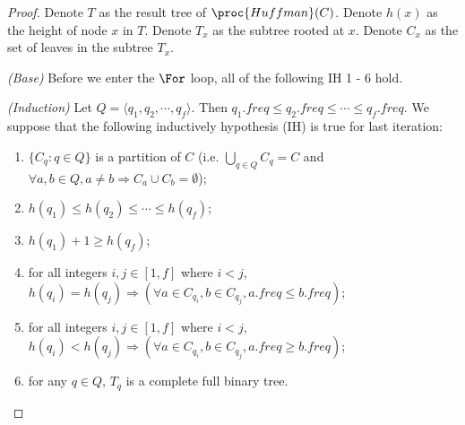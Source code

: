 \begin{proof}
    Denote $T$ as the result tree of $\proc{Huffman}(C)$.
    Denote $h(x)$ as the height of node $x$ in $T$.
    Denote $T_x$ as the subtree rooted at $x$.
    Denote $C_x$ as the set of leaves in the subtree $T_x$.
    
    \textit{(Base)}
    Before we enter the $\For$ loop,
    all of the following IH 1 - 6 hold.

    \textit{(Induction)}
    Let $Q = \langle q_1, q_2, \cdots, q_f \rangle$.
    Then $q_1.freq \leq q_2.freq \leq \cdots \leq q_f.freq$.
    We suppose that the following inductively hypothesis (IH) is true
    for last iteration:
    \begin{enumerate}
        \item $\{ C_q : q \in Q \}$ is a partition of $C$
        (i.e. $\bigcup\limits_{q \in Q} C_q = C$
        and $\forall a, b \in Q, 
        a \neq b \Longrightarrow C_a \cup C_b = \emptyset$);
        \item $h(q_1) \leq h(q_2) \leq \cdots \leq h(q_f)$;
        \item $h(q_1) + 1 \geq h(q_f)$;
        \item for all integers $i,j \in [1,f]$ where $i < j$,
        $h(q_i) = h(q_j) \Longrightarrow 
        (\forall a \in C_{q_i}, b \in C_{q_j}, a.freq \leq b.freq)$;
        \item for all integers $i,j \in [1,f]$ where $i < j$,
        $h(q_i) < h(q_j) \Longrightarrow 
        (\forall a \in C_{q_i}, b \in C_{q_j}, a.freq \geq b.freq)$;
        \item for any $q \in Q$, $T_q$ is a complete full binary tree.
    \end{enumerate}


\end{proof}

